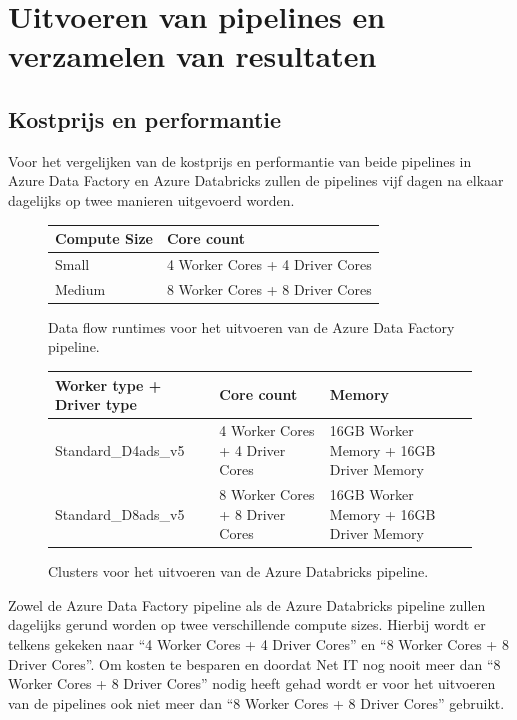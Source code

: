 \chapter{Uitvoeren van pipelines en verzamelen van resultaten}%
\label{ch:uitvoeren}

\section{Kostprijs en performantie}

Voor het vergelijken van de kostprijs en performantie van beide pipelines in Azure Data Factory en Azure Databricks zullen de pipelines vijf dagen na elkaar dagelijks op twee manieren uitgevoerd worden.

\begin{figure}[H]%
    \centering
    \begin{tabularx}{0.9\textwidth}{ |X|X| }
        \hline
        \textbf{Compute Size} & \textbf{Core count} \\
        \hline 
        Small  & 4 Worker Cores + 4 Driver Cores  \\
        \hline
        Medium & 8 Worker Cores + 8 Driver Cores \\
        \hline
    \end{tabularx}
    \caption{Data flow runtimes voor het uitvoeren van de Azure Data Factory pipeline.}
\end{figure}
    
\begin{figure}[H]%
    \centering
    \begin{tabularx}{0.9\textwidth}{ |X|X|X| }
        \hline
        \textbf{Worker type + Driver type} & \textbf{Core count} & \textbf{Memory} \\
        \hline 
        Standard\_D4ads\_v5 & 4 Worker Cores + 4 Driver Cores & 16GB Worker Memory + 16GB Driver Memory  \\
        \hline
        Standard\_D8ads\_v5 & 8 Worker Cores + 8 Driver Cores & 16GB Worker Memory + 16GB Driver Memory  \\
        \hline
    \end{tabularx}
    \caption{Clusters voor het uitvoeren van de Azure Databricks pipeline.}
\end{figure}

Zowel de Azure Data Factory pipeline als de Azure Databricks pipeline zullen dagelijks gerund worden op twee verschillende compute sizes. Hierbij wordt er telkens gekeken naar ``4 Worker Cores + 4 Driver Cores'' en ``8 Worker Cores + 8 Driver Cores''. Om kosten te besparen en doordat Net IT nog nooit meer dan ``8 Worker Cores + 8 Driver Cores'' nodig heeft gehad wordt er voor het uitvoeren van de pipelines ook niet meer dan ``8 Worker Cores + 8 Driver Cores'' gebruikt.

